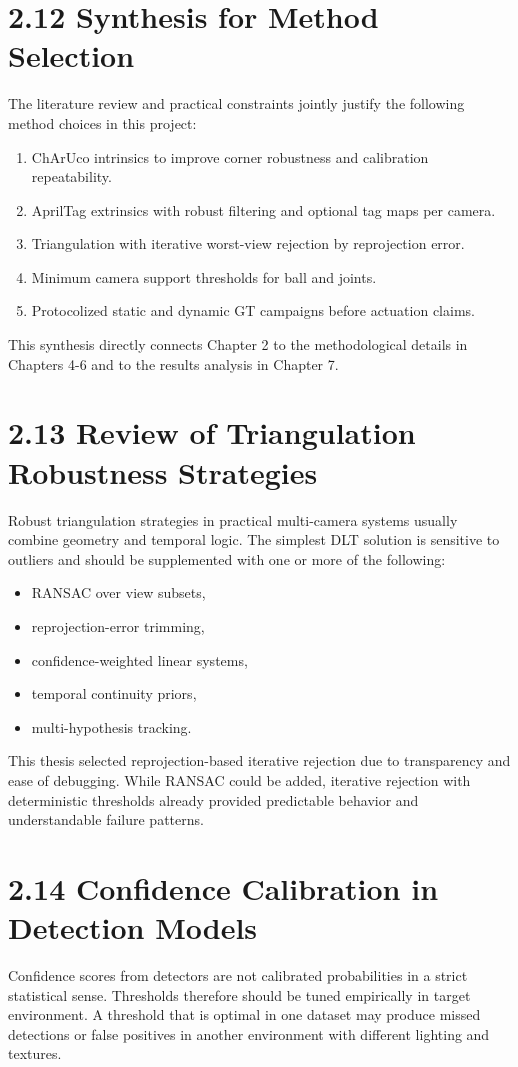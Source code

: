 \section{2.12 Synthesis for Method Selection}
The literature review and practical constraints jointly justify the following method choices in this project:
\begin{enumerate}
  \item ChArUco intrinsics to improve corner robustness and calibration repeatability.
  \item AprilTag extrinsics with robust filtering and optional tag maps per camera.
  \item Triangulation with iterative worst-view rejection by reprojection error.
  \item Minimum camera support thresholds for ball and joints.
  \item Protocolized static and dynamic GT campaigns before actuation claims.
\end{enumerate}

This synthesis directly connects Chapter 2 to the methodological details in Chapters 4-6 and to the results analysis in Chapter 7.



\section{2.13 Review of Triangulation Robustness Strategies}
Robust triangulation strategies in practical multi-camera systems usually combine geometry and temporal logic. The simplest DLT solution is sensitive to outliers and should be supplemented with one or more of the following:
\begin{itemize}
  \item RANSAC over view subsets,
  \item reprojection-error trimming,
  \item confidence-weighted linear systems,
  \item temporal continuity priors,
  \item multi-hypothesis tracking.
\end{itemize}

This thesis selected reprojection-based iterative rejection due to transparency and ease of debugging. While RANSAC could be added, iterative rejection with deterministic thresholds already provided predictable behavior and understandable failure patterns.

\section{2.14 Confidence Calibration in Detection Models}
Confidence scores from detectors are not calibrated probabilities in a strict statistical sense. Thresholds therefore should be tuned empirically in target environment. A threshold that is optimal in one dataset may produce missed detections or false positives in another environment with different lighting and textures.

